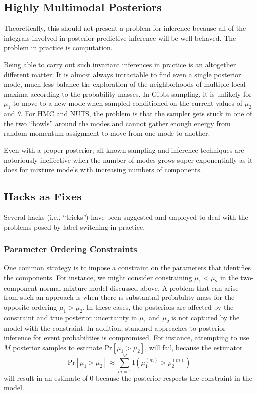 \subsection{Highly Multimodal Posteriors}

Theoretically, this should not present a problem for inference because
all of the integrals involved in posterior predictive inference will
be well behaved. The problem in practice is computation.

Being able to carry out such invariant inferences in practice is an
altogether different matter.  It is almost always intractable to find
even a single posterior mode, much less balance the exploration of the
neighborhoods of multiple local maxima according to the probability
masses. In Gibbs sampling, it is unlikely for $\mu_1$
to move to a new mode when sampled conditioned on the current values
of $\mu_2$ and $\theta$. For HMC and NUTS, the problem is that the
sampler gets stuck in one of the two ``bowls'' around the modes and
cannot gather enough energy from random momentum assignment to move
from one mode to another.

Even with a proper posterior, all known sampling and inference
techniques are notoriously ineffective when the number of modes grows
super-exponentially as it does for mixture models with increasing
numbers of components.

\subsection{Hacks as Fixes}

Several hacks (i.e., ``tricks'') have been suggested and employed to
deal with the problems posed by label switching in practice.

\subsubsection{Parameter Ordering Constraints}

One common strategy is to impose a constraint on the parameters that
identifies the components.  For instance, we might consider
constraining $\mu_1 < \mu_2$ in the two-component normal mixture model
discussed above.  A problem that can arise from such an approach is
when there is substantial probability mass for the opposite ordering
$\mu_1 > \mu_2$.  In these cases, the posteriors are affected by
the constraint and true posterior uncertainty in $\mu_1$ and $\mu_2$
is not captured by the model with the constraint.  In addition,
standard approaches to posterior inference for event probabilities is
compromised.  For instance, attempting to use $M$ posterior samples to
estimate $\mbox{Pr}[\mu_1 > \mu_2]$, will fail, because the estimator
\[
\mbox{Pr}[\mu_1 > \mu_2]
\approx
\sum_{m=1}^M \mbox{I}(\mu_1^{(m)} > \mu_2^{(m)})
\]
will result in an estimate of 0 because the posterior respects the
constraint in the model.


